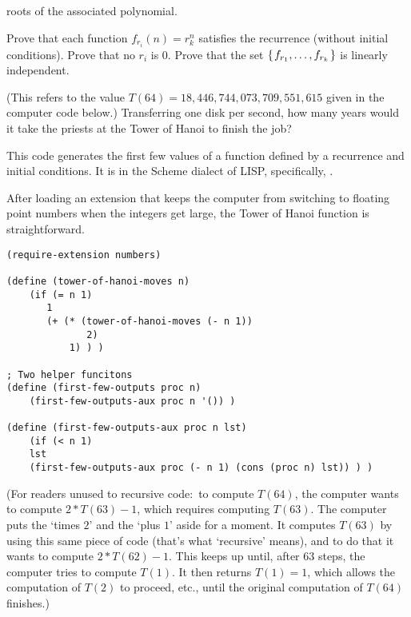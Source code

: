 \begin{exercises}
    roots of the associated polynomial.
    \begin{exparts}
      \partsitem Prove that each function 
         $f_{r_i}(n)=r_k^n$
         satisfies the recurrence (without initial conditions).
      \partsitem Prove that no $r_i$ is $0$.
      \partsitem Prove that the set 
        $\mbox{$\{\hspace{0.1em}f_{r_1},\dots,f_{r_k}\hspace{0.1em}\}$}$
        is linearly independent.
    \end{exparts}
  \item 
    (This refers to the value $T(64)=18,446,744,073,709,551,615$
    given in the computer code below.)
    Transferring one disk per second, how many years would it take
    the priests at the Tower of Hanoi to finish the job?
\end{exercises}

\announcecomputercode
This code generates the first few values of a function 
defined by a recurrence and initial conditions.
It is in the Scheme dialect of LISP,
specifically, \cite{ChickenScheme}.

After loading an extension that keeps the computer from switching to
floating point numbers when the integers get large,
the Tower of Hanoi function is straightforward.
\begin{lstlisting}
(require-extension numbers)

(define (tower-of-hanoi-moves n) 
    (if (= n 1)
       1
       (+ (* (tower-of-hanoi-moves (- n 1)) 
              2) 
           1) ) )

; Two helper funcitons
(define (first-few-outputs proc n)
    (first-few-outputs-aux proc n '()) )

(define (first-few-outputs-aux proc n lst)
    (if (< n 1)
    lst 
    (first-few-outputs-aux proc (- n 1) (cons (proc n) lst)) ) )
\end{lstlisting}
\noindent (For readers unused to recursive code:~to compute $T(64)$, 
the computer wants to compute $2*T(63)-1$, which requires
computing $T(63)$.
The computer puts the `times $2$' and the `plus $1$' aside for a moment.
It computes  $T(63)$ by using this same piece of code (that's 
what `recursive' means), and to do that it wants to compute $2*T(62)-1$.
This keeps up until, after $63$ steps, the computer
tries to compute $T(1)$.
It then returns $T(1)=1$, 
which allows the computation of $T(2)$ to proceed,
etc., until the original computation of $T(64)$ finishes.)

